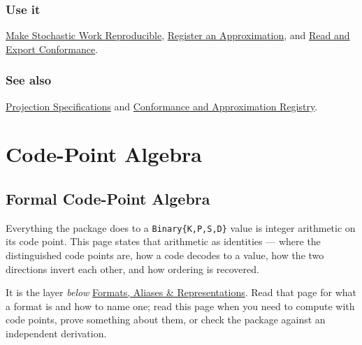 \subsection{Use it}



\label{7476714143305412830}{}


\href{workflow\_\allowbreak{}stochastic.md}{Make Stochastic Work Reproducible}, \href{workflow\_\allowbreak{}approximation.md}{Register an Approximation}, and \href{workflow\_\allowbreak{}conformance.md}{Read and Export Conformance}.



\subsection{See also}



\label{292862844209942199-dup6}{}


\href{reference\_\allowbreak{}projections.md}{Projection Specifications} and \href{reference\_\allowbreak{}conformance.md}{Conformance and Approximation Registry}.



\chapter{Code-Point Algebra}


\section{Formal Code-Point Algebra}



\label{742985200444114925}{}


Everything the package does to a \texttt{Binary\{K,P,S,D\}} value is integer arithmetic on its code point. This page states that arithmetic as identities — where the distinguished code points are, how a code decodes to a value, how the two directions invert each other, and how ordering is recovered.



It is the layer \emph{below} \href{concept\_\allowbreak{}format\_\allowbreak{}anatomy.md}{Formats, Aliases \& Representations}. Read that page for what a format is and how to name one; read this page when you need to compute with code points, prove something about them, or check the package against an independent derivation.



